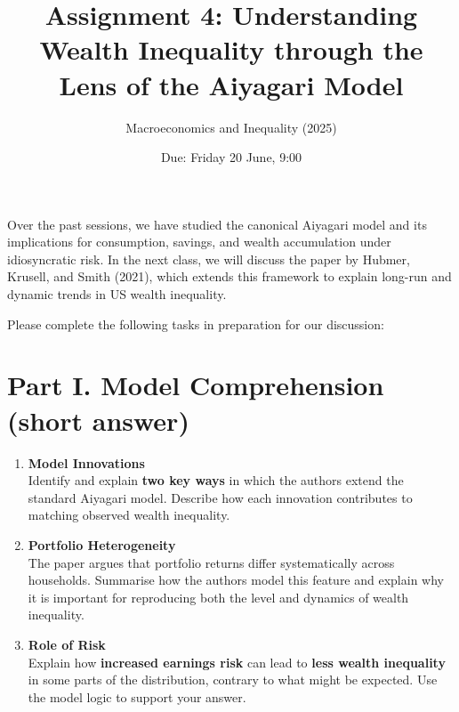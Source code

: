 \documentclass[12pt]{article}
\title{Assignment 4: Understanding Wealth Inequality through the Lens of the Aiyagari Model}
\author{Macroeconomics and Inequality (2025)}
\date{Due: Friday 20 June, 9:00}
\begin{document}
\maketitle

Over the past sessions, we have studied the canonical Aiyagari model and its implications for consumption, savings, and wealth accumulation under idiosyncratic risk. In the next class, we will discuss the paper by Hubmer, Krusell, and Smith (2021), which extends this framework to explain long-run and dynamic trends in US wealth inequality.

Please complete the following tasks in preparation for our discussion:

\section*{Part I. Model Comprehension (short answer)}
\begin{enumerate}[label=\textbf{\arabic*.}]
    \item \textbf{Model Innovations} \\
    Identify and explain \textbf{two key ways} in which the authors extend the standard Aiyagari model. Describe how each innovation contributes to matching observed wealth inequality.

    \item \textbf{Portfolio Heterogeneity} \\
    The paper argues that portfolio returns differ systematically across households. Summarise how the authors model this feature and explain why it is important for reproducing both the level and dynamics of wealth inequality.

    \item \textbf{Role of Risk} \\
    Explain how \textbf{increased earnings risk} can lead to \textbf{less wealth inequality} in some parts of the distribution, contrary to what might be expected. Use the model logic to support your answer.
\end{enumerate}
\end{document}
